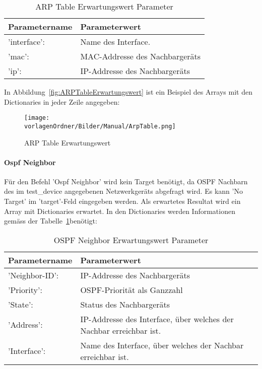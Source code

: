 \documentclass[]{subfiles}
\begin{document}
			\begin{table}[h!]
				\begin{tabularx}{\textwidth}{lX}
				\toprule
				Parametername & Parameterwert \\
				\midrule
				'interface': &  Name des Interface. \\
				'mac': &  MAC-Addresse des Nachbargeräts \\
				'ip': & IP-Addresse des Nachbargeräts \\
				\bottomrule
				\end{tabularx}
				\caption{ARP Table Erwartungswert Parameter}
			\end{table}
			

			In Abbildung~\ref{fig:ARPTableErwartungswert} ist ein Beispiel des Arrays mit den Dictionaries in jeder Zeile angegeben:

			\begin{figure}[h!]
				\begin{center}
					\texttt{[image: \\vorlagenOrdner/Bilder/Manual/ArpTable.png]}
					\caption{ARP Table Erwartungswert}
					\label{ARPTableErwartungswert}
				\end{center}
			\end{figure}

		\paragraph*{Ospf Neighbor}
			Für den Befehl 'Ospf Neighbor' wird kein Target benötigt, 
			da OSPF Nachbarn des im test\_device angegebenen Netzwerkgeräts abgefragt wird. 
			Es kann 'No Target' im 'target'-Feld eingegeben werden.	
			Als erwartetes Resultat wird ein Array mit Dictionaries erwartet. 
			In den Dictionaries werden Informationen gemäss der Tabelle~\ref{table:OSPFErwartungswert}benötigt:

			\begin{table}[h!]
				\begin{tabularx}{\textwidth}{lX}
				\toprule
				Parametername & Parameterwert\\
				\midrule 
				'Neighbor-ID': & IP-Addresse des Nachbargeräts \\
				'Priority': & OSPF-Priorität als Ganzzahl\\
				'State': & Status des Nachbargeräts \\
				'Address': & IP-Addresse des Interface, über welches der Nachbar erreichbar ist. \\
				'Interface': & Name des Interface, über welches der Nachbar erreichbar ist. \\
				\bottomrule
				\end{tabularx}
				\caption{OSPF Neighbor Erwartungswert Parameter}
				\label{table:OSPFErwartungswert}
			\end{table}
			
\end{document}
